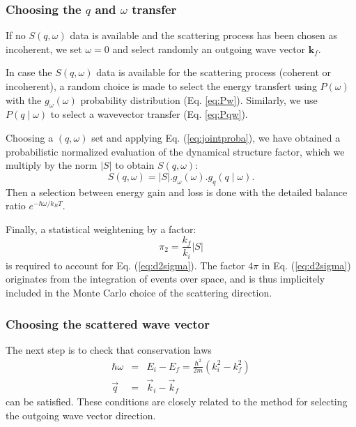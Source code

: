 \subsubsection{Choosing the $q$ and $\omega$ transfer}

If no $S(q, \omega)$ data is available and the scattering process has been chosen as incoherent, we set $\omega=0$ and select randomly an outgoing wave vector $\boldsymbol{k}_f$.

In case the $S(q, \omega)$ data is available for the scattering process (coherent or incoherent), a random choice is made to select the energy transfert using $P(\omega)$ with the $g_\omega(\omega)$ probability distribution (Eq. \ref{eq:Pw}).
Similarly, we use $P(q \mid \omega)$ to select a wavevector transfer (Eq. \ref{eq:Pqw}).

Choosing a $(q, \omega)$ set and applying Eq. (\ref{eq:jointproba}), we have obtained a probabilistic normalized evaluation of the dynamical structure factor, which we multiply by the norm $|S|$ to obtain $S(q, \omega)$:
\begin{equation}
S(q, \omega) = |S|.g_\omega(\omega).g_q(q \mid \omega) .
\end{equation}
Then a selection between energy gain and loss is done with the detailed balance ratio $e^{-\hbar \omega / k_B T}$.

Finally, a statistical weightening by a factor:
\begin{equation}
\pi_2 = \frac{k_f}{k_i} |S|
\end{equation}
is required to account for Eq. (\ref{eq:d2sigma}). The factor $4 \pi$ in Eq. (\ref{eq:d2sigma}) originates from the integration of events over space, and is thus implicitely included in the Monte Carlo choice of the scattering direction.

\subsubsection{Choosing the scattered wave vector}

The next step is to check that conservation laws
\begin{eqnarray}
\hbar \omega &=& E_i - E_f = \frac{\hbar^2}{2m}(k_i^2 - k_f^2) \label{eq:q-transfert} \\
\vec q &=& \vec k_i - \vec k_f \label{eq:w-transfert}
\end{eqnarray}
can be satisfied. These conditions are closely related to the method for selecting the outgoing wave vector direction.

